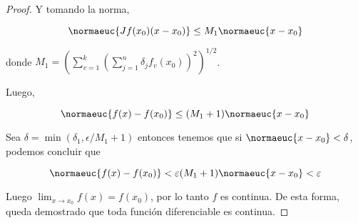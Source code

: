 \begin{proof}
    Y tomando la norma,
    
    \[
    \normaeuc{Jf(x_0)(x-x_0)} \leq M_1\normaeuc{x-x_0}
    \]
    
    \noindent donde $\displaystyle M_1 = \left( \sum_{v = 1}^k \left( \sum_{j=1}^n \delta_j f_v(x_0) \right)^2 \right)^{1/2}$.
    
    Luego,
    
    \[
    \normaeuc{f(x) - f(x_0)} \leq (M_1 + 1)\normaeuc{x - x_0}
    \]
    
    Sea $\delta = \min(\delta_1, \epsilon / M_1 + 1)$ entonces tenemos que si $\normaeuc{x - x_0} < \delta$, podemos concluir que
    
    \[
    \normaeuc{f(x) - f(x_0)} < \varepsilon(M_1 + 1)\normaeuc{x - x_0} < \varepsilon
    \]
    
    Luego $\lim_{x \to x_0} f(x) = f(x_0)$, por lo tanto $f$ es continua. De esta forma, queda demostrado que toda función diferenciable es continua.
\end{proof}